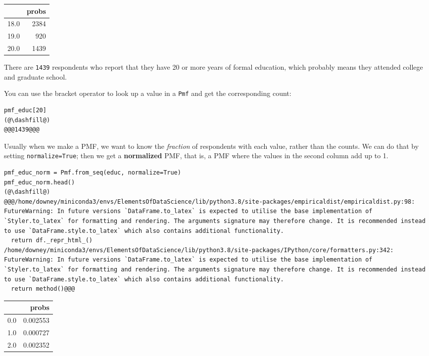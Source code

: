 \begin{tabular}{lr}
\midrule
{} &  probs \\
\midrule
18.0 &   2384 \\
19.0 &    920 \\
20.0 &   1439 \\
\midrule
\end{tabular}

There are \passthrough{\lstinline!1439!} respondents who report that
they have 20 or more years of formal education, which probably means
they attended college and graduate school.

You can use the bracket operator to look up a value in a
\passthrough{\lstinline!Pmf!} and get the corresponding count:

\begin{lstlisting}[]
pmf_educ[20]
(@\dashfill@)
@@@1439@@@
\end{lstlisting}

Usually when we make a PMF, we want to know the \emph{fraction} of
respondents with each value, rather than the counts. We can do that by
setting \passthrough{\lstinline!normalize=True!}; then we get a
\textbf{normalized} PMF, that is, a PMF where the values in the second
column add up to 1.

\begin{lstlisting}[]
pmf_educ_norm = Pmf.from_seq(educ, normalize=True)
pmf_educ_norm.head()
(@\dashfill@)
@@@/home/downey/miniconda3/envs/ElementsOfDataScience/lib/python3.8/site-packages/empiricaldist/empiricaldist.py:98: FutureWarning: In future versions `DataFrame.to_latex` is expected to utilise the base implementation of `Styler.to_latex` for formatting and rendering. The arguments signature may therefore change. It is recommended instead to use `DataFrame.style.to_latex` which also contains additional functionality.
  return df._repr_html_()
/home/downey/miniconda3/envs/ElementsOfDataScience/lib/python3.8/site-packages/IPython/core/formatters.py:342: FutureWarning: In future versions `DataFrame.to_latex` is expected to utilise the base implementation of `Styler.to_latex` for formatting and rendering. The arguments signature may therefore change. It is recommended instead to use `DataFrame.style.to_latex` which also contains additional functionality.
  return method()@@@
\end{lstlisting}

\begin{tabular}{lr}
\midrule
{} &     probs \\
\midrule
0.0 &  0.002553 \\
1.0 &  0.000727 \\
2.0 &  0.002352 \\
\midrule
\end{tabular}

